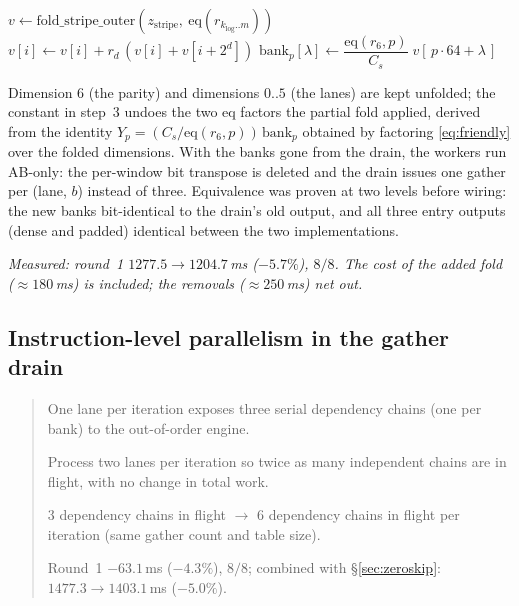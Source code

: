 \documentclass[11pt]{article}
\newcommand{\eq}{\mathrm{eq}}
\newenvironment{optsummary}{%
  \begin{quote}\small
  \begin{description}
  \setlength{\itemsep}{1pt}\setlength{\parsep}{0pt}\setlength{\topsep}{2pt}
}{%
  \end{description}
  \end{quote}
}
\begin{document}
\begin{algorithmic}[1]
\State $v \gets \mathrm{fold\_stripe\_outer}(z_{\mathrm{stripe}},\
  \eq(r_{k_{\log}..m}))$
  \State $v[i] \gets v[i] + r_d\,(v[i]+v[i+2^{d}])$
\EndFor
\State $\mathrm{bank}_p[\lambda] \gets \dfrac{\eq(r_6,p)}{C_s}\;
       v[\,p\cdot64+\lambda\,]$
\end{algorithmic}

\noindent
Dimension 6 (the parity) and dimensions $0..5$ (the lanes) are kept unfolded;
the constant in step~3 undoes the two eq factors the partial fold applied,
derived from the identity $Y_p = (C_s/\eq(r_6,p))\,\mathrm{bank}_p$ obtained
by factoring \eqref{eq:friendly} over the folded dimensions. With the banks
gone from the drain, the workers run AB-only: the per-window bit transpose is
deleted and the drain issues one gather per (lane, $b$) instead of three.
Equivalence was proven at two levels before wiring: the new banks
bit-identical to the drain's old output, and all three entry outputs
(dense and padded) identical between the two implementations.

\emph{Measured: round~1 $1277.5\to1204.7\,$ms ($-5.7\%$), $8/8$. The cost of
the added fold ($\approx180\,$ms) is included; the removals
($\approx250\,$ms) net out.}

\subsection{Instruction-level parallelism in the gather drain}\label{sec:twolane}

\begin{optsummary}
\item[Baseline:] One lane per iteration exposes three serial dependency chains (one per bank) to the out-of-order engine.
\item[Improvement:] Process two lanes per iteration so twice as many independent chains are in flight, with no change in total work.
\item[Mechanism:] 3 dependency chains in flight $\to$ 6 dependency chains in flight per iteration (same gather count and table size).
\item[Result:] Round~1 $-63.1\,$ms ($-4.3\%$), $8/8$; combined with \S\ref{sec:zeroskip}: $1477.3\to1403.1\,$ms ($-5.0\%$).
\end{optsummary}
\end{document}
